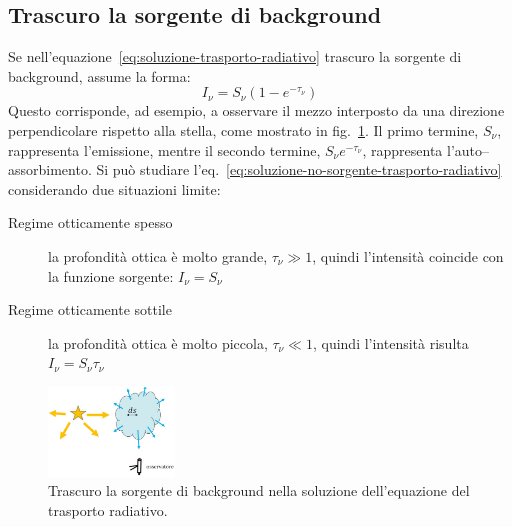 \subsection{Trascuro la sorgente di background}\label{sec:trascuro-sorgente-trasporto-radiativo}
Se nell'equazione~\eqref{eq:soluzione-trasporto-radiativo} trascuro la sorgente di background, assume la forma:
\begin{equation}\label{eq:soluzione-no-sorgente-trasporto-radiativo}
    I_\nu = S_\nu (1- e^{-\tau_\nu})
\end{equation}
Questo corrisponde, ad esempio, a osservare il mezzo interposto da una direzione perpendicolare rispetto alla stella, come mostrato in fig.~\ref{fig:trasporto-radiativo-perpendicolare}. Il primo termine, $S_\nu$, rappresenta l'emissione, mentre il secondo termine, $S_\nu e^{-\tau_\nu}$, rappresenta l'auto--assorbimento. Si può studiare l'eq.~\eqref{eq:soluzione-no-sorgente-trasporto-radiativo} considerando due situazioni limite:
\begin{description}
    \item[Regime otticamente spesso] la profondità ottica è molto grande, $\tau_\nu \gg 1$, quindi l'intensità coincide con la funzione sorgente: $I_\nu = S_\nu$
    \item[Regime otticamente sottile] la profondità ottica è molto piccola, $\tau_\nu \ll 1$, quindi l'intensità risulta $I_\nu = S_\nu \tau_\nu$
\end{description}

\begin{figure}
\centering
\includegraphics[width=0.3\textwidth]{immagini/trasporto-radiativo-perpendicolare.jpg}
\caption{Trascuro la sorgente di background nella soluzione dell'equazione del trasporto radiativo.}
\label{fig:trasporto-radiativo-perpendicolare}
\end{figure}

